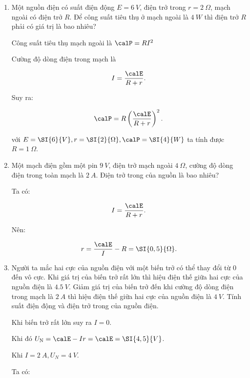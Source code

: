 \begin{enumerate}[label=\bfseries Câu \arabic*:]
		\item {}
		
		
		{
		Một nguồn điện có suất điện động $E = \SI{6}{V}$, điện trở trong $r = \SI{2}{\Omega}$, mạch ngoài có điện trở $R$. Để công suất tiêu thụ ở mạch ngoài là $\SI{4}{W}$ thì điện trở $R$ phải có giá trị là bao nhiêu?
		}
		
		\hideall
		{	
			
			Công suất tiêu thụ mạch ngoài là $\calP = RI^2$
			
			Cường độ dòng điện trong mạch là
			
			$$I = \dfrac{\calE}{R+r}.$$
			
			Suy ra:
			
			$$\calP = R \left(\dfrac{\calE}{R+r}\right)^2.$$
			
			với $E = \SI{6}{V}, r = \SI{2}{\Omega}, \calP = \SI{4}{W}$ ta tính được $R = \SI{1}{\Omega}$.
			
		}
		\item {}
		
		
		{
		Một mạch điện gồm một pin $\SI{9}{V}$, điện trở mạch ngoài $\SI{4}{\Omega}$, cường độ dòng điện trong toàn mạch là $\SI{2}{A}$. Điện trở trong của nguồn là bao nhiêu?
		}
		
		\hideall
		{	
			Ta có:
			
			$$ I = \dfrac{\calE}{R+r}.$$
			
			Nên:
			
			$$r = \dfrac{\calE}{I} - R = \SI{0,5}{\Omega}.$$
			
			
			
		}
		\item {}
		
		
		{
		Người ta mắc hai cực của nguồn điện với một biến trở có thể thay đổi từ 0 đến vô cực. Khi giá trị của biến trở rất lớn thì hiệu điện thế giữa hai cực của nguồn điện là $\SI{4,5}{V}$. Giảm giá trị của biến trở đến khi cường độ dòng điện trong mạch là $\SI{2}{A}$ thì hiệu điện thế giữa hai cực của nguồn điện là $\SI{4}{V}$. Tính suất điện động và điện trở trong của nguồn điện.
		}
		
		\hideall
		{	
			Khi biến trở rất lớn suy ra $I = 0$.
			
			Khi đó $U_\text{N} = \calE - Ir = \calE = \SI{4,5}{V} $.
			
			Khi $I = \SI{2}{A}, U_N = \SI{4}{V}$.
			
			Ta có:
			
}
\end{enumerate}
